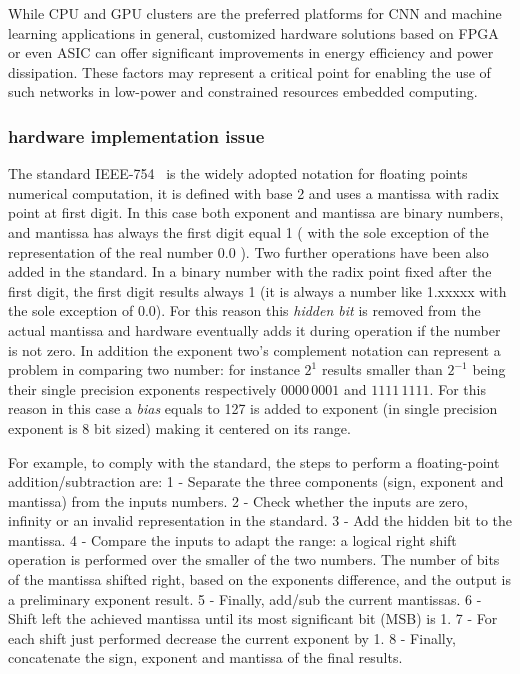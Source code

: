 While CPU and GPU clusters are the preferred platforms for \acs{CNN} and machine learning applications in general, customized hardware solutions based on \acs{FPGA} or even \acs{ASIC} can offer significant improvements in energy efficiency and power dissipation. 
These factors may represent a critical point for enabling the use of such networks in low-power and constrained resources embedded computing.

\subsubsection*{hardware implementation issue}

The standard IEEE-754~\cite{1985--ieee754} is the widely adopted notation for floating points numerical computation, it is defined with base 2 and uses a mantissa with radix point at first digit. In this case both exponent and mantissa are binary numbers, and mantissa has always the first digit equal 1 ( with the sole exception of the representation of the real number 0.0 ). 
Two further operations have been also added in the standard. In a binary number with the radix point fixed after the first digit, the first digit results always 1 (it is always a number like 1.xxxxx with the sole exception of 0.0). For this reason this \textit{hidden bit} is removed from the actual mantissa and hardware eventually adds it during operation if the number is not zero.
In addition the exponent two's complement notation can represent a problem in comparing two number: for instance $2^1$ results smaller than $2^{-1}$ being their single precision exponents respectively $0000\,0001$ and $1111\,1111$. For this reason in this case a \textit{bias} equals to 127 is added to exponent (in single precision exponent is 8 bit sized) making it centered on its range.

For example, to comply with the standard, the steps to perform a floating-point addition/subtraction are: 
1 - Separate the three components (sign, exponent and mantissa) from the inputs numbers.
2 - Check whether the inputs are zero, infinity or an invalid representation in the standard. 
3 - Add the hidden bit to the mantissa.
4 - Compare the inputs to adapt the range: a logical right shift operation is performed over the smaller of the two numbers. The number of bits of the mantissa shifted right, based on the exponents difference, and the output is a preliminary exponent result. 
5 - Finally, add/sub the current mantissas.
6 - Shift left the achieved mantissa until its most significant bit (MSB) is 1. 
7 - For each shift just performed decrease the current exponent by 1. 
8 - Finally, concatenate the sign, exponent and mantissa of the final results.

